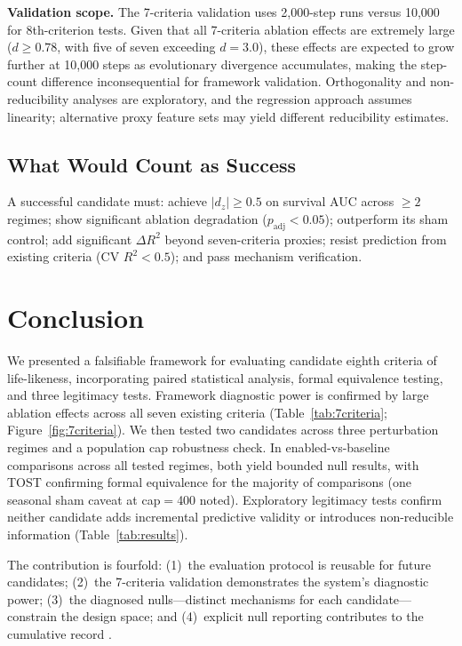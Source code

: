 \documentclass[letterpaper]{article}
\begin{document}
\textbf{Validation scope.}  The 7-criteria validation uses 2{,}000-step
runs versus 10{,}000 for 8th-criterion tests.  Given that all
7-criteria ablation effects are extremely large ($d \geq 0.78$, with
five of seven exceeding $d = 3.0$), these effects are expected to grow further
at 10{,}000 steps as evolutionary divergence accumulates, making the
step-count difference inconsequential for framework validation.
Orthogonality and non-reducibility analyses are exploratory, and the
regression approach assumes linearity; alternative proxy feature sets
may yield different reducibility estimates.


\subsection{What Would Count as Success}

A successful candidate must: achieve $|d_z| \geq 0.5$ on survival AUC
across $\geq 2$ regimes; show significant ablation degradation
($p_\mathrm{adj} < 0.05$); outperform its sham control; add significant
$\Delta R^2$ beyond seven-criteria proxies; resist prediction from
existing criteria (CV $R^2 < 0.5$); and pass mechanism verification.


\section{Conclusion}

We presented a falsifiable framework for evaluating candidate eighth
criteria of life-likeness, incorporating paired statistical analysis,
formal equivalence testing, and three legitimacy tests.  Framework
diagnostic power is confirmed by large ablation effects across all seven
existing criteria (Table~\ref{tab:7criteria}; Figure~\ref{fig:7criteria}).
We then tested two candidates across three perturbation regimes and a
population cap robustness check.  In enabled-vs-baseline comparisons
across all tested regimes, both yield bounded null results, with TOST
confirming formal equivalence for the majority of comparisons (one
seasonal sham caveat at cap$=$400 noted).  Exploratory legitimacy tests
confirm neither candidate adds incremental predictive validity or
introduces non-reducible information (Table~\ref{tab:results}).

The contribution is fourfold: (1)~the evaluation protocol is reusable
for future candidates; (2)~the 7-criteria validation demonstrates the
system's diagnostic power; (3)~the diagnosed nulls---distinct mechanisms
for each candidate---constrain the design space; and (4)~explicit null
reporting contributes to the cumulative record
\citep{rosenthal_1979_file, fanelli_2012_negative}.
\end{document}
